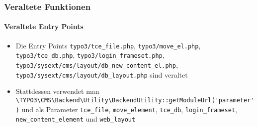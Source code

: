 
\begin{frame}[fragile]
	\frametitle{Veraltete Funktionen}
	\framesubtitle{Veraltete Entry Points}

	\lstset{
		basicstyle=\tiny\ttfamily
	}
	
	\begin{itemize}
		\item Die Entry Points \texttt{typo3/tce\_file.php}, \texttt{typo3/move\_el.php}, \texttt{typo3/tce\_db.php}, \texttt{typo3/login\_frameset.php}, \texttt{typo3/sysext/cms/layout/db\_new\_content\_el.php}, \texttt{typo3/sysext/cms/layout/db\_layout.php} sind veraltet
		\item Stattdessen verwendet man \lstinline{\TYPO3\CMS\Backend\Utility\BackendUtility::getModuleUrl('parameter')} und als Parameter \texttt{tce\_file}, \texttt{move\_element}, \texttt{tce\_db}, \texttt{login\_frameset}, \texttt{new\_content\_element} und \texttt{web\_layout}
	\end{itemize}

\end{frame}


